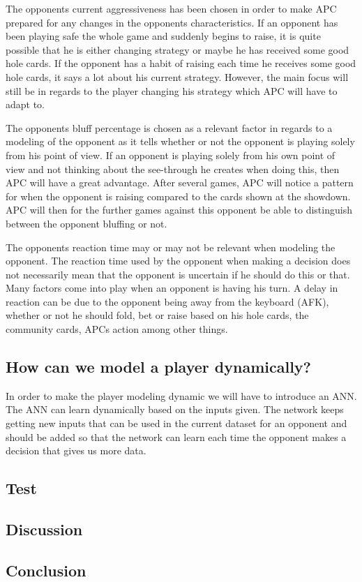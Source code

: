 The opponents current aggressiveness has been chosen in order to make APC prepared for any changes in the opponents characteristics. If an opponent has been playing safe the whole game and suddenly begins to raise, it is quite possible that he is either changing strategy or maybe he has received some good hole cards. If the opponent has a habit of raising each time he receives some good hole cards, it says a lot about his current strategy. However, the main focus will still be in regards to the player changing his strategy which APC will have to adapt to.

The opponents bluff percentage is chosen as a relevant factor in regards to a modeling of the opponent as it tells whether or not the opponent is playing solely from his point of view. If an opponent is playing solely from his own point of view and not thinking about the see-through he creates when doing this, then APC will have a great advantage. After several games, APC will notice a pattern for when the opponent is raising compared to the cards shown at the showdown. APC will then for the further games against this opponent be able to distinguish between the opponent bluffing or not.


The opponents reaction time may or may not be relevant when modeling the opponent. The reaction time used by the opponent when making a decision does not necessarily mean that the opponent is uncertain if he should do this or that. Many factors come into play when an opponent is having his turn. A delay in reaction can be due to the opponent being away from the keyboard (AFK), whether or not he should fold, bet or raise based on his hole cards, the community cards, APCs action among other things. 
\\

\subsection{How can we model a player dynamically?}
In order to make the player modeling dynamic we will have to introduce an ANN. The ANN can learn dynamically based on the inputs given. The network keeps getting new inputs that can be used in the current dataset for an opponent and should be added so that the network can learn each time the opponent makes a decision that gives us more data.

\subsection{Test}


\subsection{Discussion}

\subsection{Conclusion}